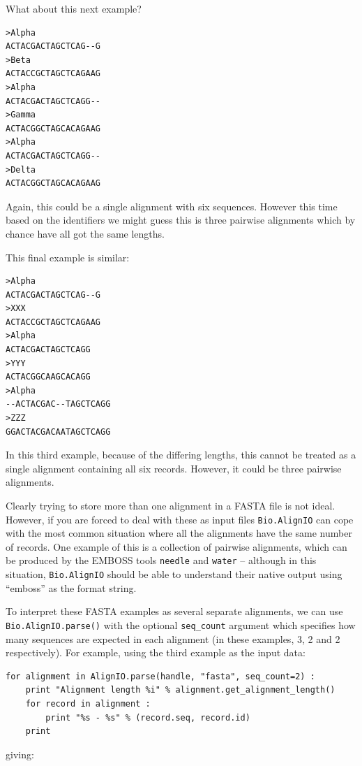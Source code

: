 \documentclass{report}
\begin{document}
What about this next example?

\begin{verbatim}
>Alpha
ACTACGACTAGCTCAG--G
>Beta
ACTACCGCTAGCTCAGAAG
>Alpha
ACTACGACTAGCTCAGG--
>Gamma
ACTACGGCTAGCACAGAAG
>Alpha
ACTACGACTAGCTCAGG--
>Delta
ACTACGGCTAGCACAGAAG
\end{verbatim}

\noindent Again, this could be a single alignment with six sequences.  However this time based on the identifiers we might guess this is three pairwise alignments which by chance have all got the same lengths.

This final example is similar:

\begin{verbatim}
>Alpha
ACTACGACTAGCTCAG--G
>XXX
ACTACCGCTAGCTCAGAAG
>Alpha
ACTACGACTAGCTCAGG
>YYY
ACTACGGCAAGCACAGG
>Alpha
--ACTACGAC--TAGCTCAGG
>ZZZ
GGACTACGACAATAGCTCAGG
\end{verbatim}

\noindent In this third example, because of the differing lengths, this cannot be treated as a single alignment containing all six records.  However, it could be three pairwise alignments.

Clearly trying to store more than one alignment in a FASTA file is not ideal.  However, if you are forced to deal with these as input files \verb|Bio.AlignIO| can cope with the most common situation where all the alignments have the same number of records.
One example of this is a collection of pairwise alignments, which can be produced by the EMBOSS tools \verb|needle| and \verb|water| -- although in this situation, \verb|Bio.AlignIO| should be able to understand their native output using ``emboss'' as the format string.

To interpret these FASTA examples as several separate alignments, we can use \verb|Bio.AlignIO.parse()| with the optional \verb|seq_count| argument which specifies how many sequences are expected in each alignment (in these examples, 3, 2 and 2 respectively).
For example, using the third example as the input data:

\begin{verbatim}
for alignment in AlignIO.parse(handle, "fasta", seq_count=2) :
    print "Alignment length %i" % alignment.get_alignment_length()
    for record in alignment :
        print "%s - %s" % (record.seq, record.id)
    print
\end{verbatim}

\noindent giving:
\end{document}
